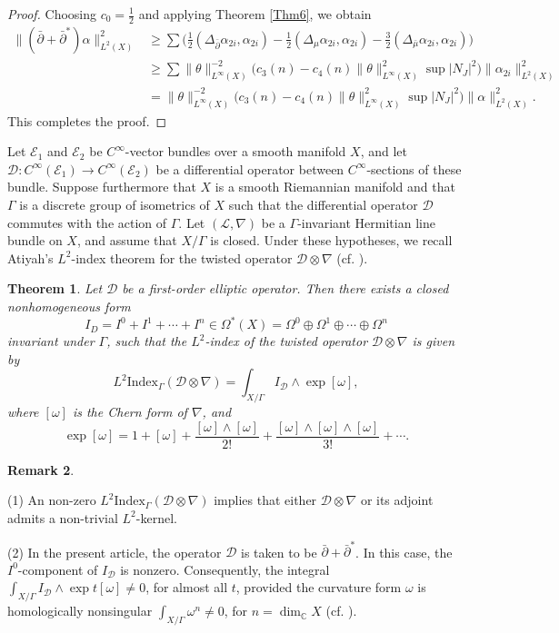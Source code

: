 \documentclass[12pt, twoside]{article}
\newtheorem{theorem}{Theorem}[section]
\theoremstyle{definition}
\newtheorem{remark}[theorem]{Remark}
\numberwithin{equation}{section}
\def \C {\mathbb{C}}
\def \a {\alpha }
\def \De {\Delta}
\def\w {\omega}
\def\Om{\Omega}
\def\pa{\partial}
\def\na {\nabla}
\def\Ga{\Gamma}
\begin{document}
\begin{proof}
	Choosing $c_{0} = \frac{1}{2}$ and applying Theorem \ref{Thm6}, we obtain
	\begin{equation*}
	\begin{split}
	\|({\bar{\partial}+\bar{\partial}^{\ast}})\a\|_{L^{2}(X)}^{2}
	&\geq\sum\Big(\frac{1}{2}(\De_{\bar{\pa}}\a_{2i},\a_{2i})-\frac{1}{2}(\De_{\mu}\a_{2i},\a_{2i})-\frac{3}{2}(\De_{\bar{\mu}}\a_{2i},\a_{2i})\Big)\\
	&\geq \sum \|\theta\|^{-2}_{L^{\infty}(X)}\Big(c_{3}(n)-c_{4}(n)\|\theta\|^{2}_{L^{\infty}(X)}\sup|N_J|^{2}\Big)\|\a_{2i}\|^{2}_{L^{2}(X)}\\
	&= \|\theta\|^{-2}_{L^{\infty}(X)}\Big(c_{3}(n)-c_{4}(n)\|\theta\|^{2}_{L^{\infty}(X)}\sup|N_J|^{2}\Big)\|\a\|_{L^{2}(X)}^{2}.
	\end{split}
	\end{equation*}
	This completes the proof.
\end{proof}

Let $\mathcal{E}_{1}$ and $\mathcal{E}_{2}$ be $C^{\infty}$-vector bundles over a smooth manifold $X$, 
and let $\mathcal{D}:C^{\infty}(\mathcal{E}_{1})\rightarrow C^{\infty}(\mathcal{E}_{2})$ be a differential operator between $C^{\infty}$-sections of these bundle. 
Suppose furthermore that $X$ is a smooth Riemannian manifold and that $\Ga$ is a discrete group of isometrics of $X$ such that 
the differential operator $\mathcal{D}$ commutes with the action of $\Ga$. Let $(\mathcal{L},\na)$ be a $\Ga$-invariant Hermitian line bundle on $X$, 
and assume that $X/\Ga$ is closed. Under these hypotheses, we recall Atiyah's $L^{2}$-index theorem for the twisted operator $\mathcal{D}\otimes\na$ (cf. \cite{Gro}).

\begin{theorem}\cite[Theorem 2.3.A]{Gro}\label{Thm5}
	Let $\mathcal{D}$ be a first-order elliptic operator. Then there exists a closed nonhomogeneous form
	\[I_{D}=I^{0}+I^{1}+\cdots+I^{n}\in\Om^{\ast}(X)=\Om^{0}\oplus\Om^{1}\oplus\cdots\oplus\Om^{n} \]
	invariant under $\Ga$, such that the $L^{2}$-index of the twisted operator $\mathcal{D}\otimes\na$ is given by
	\[L^{2}\mathrm{Index}_{\Ga}(\mathcal{D}\otimes\na)=\int_{X/\Ga}I_{\mathcal{D}}\wedge\exp{[\w]}, \]
	where $[\w]$ is the Chern form of $\na$, and
	\[\exp{[\w]}=1+[\w]+\frac{[\w]\wedge[\w]}{2!}+\frac{[\w]\wedge[\w]\wedge[\w]}{3!}+\cdots. \]
\end{theorem}

\begin{remark}\label{Rem}
	
	(1)	An non-zero $L^{2}\mathrm{Index}_{\Ga}(\mathcal{D}\otimes\na)$ implies that 
	either $\mathcal{D}\otimes\na$ or its adjoint admits a non-trivial $L^{2}$-kernel.
	
	(2) In the present article, the operator $\mathcal{D}$ is taken to be $\bar{\pa}+\bar{\pa}^{\ast}$. 
	In this case, the $I^{0}$-component of $I_{\mathcal{D}}$ is nonzero. 
	Consequently, the integral $\int_{X/\Ga}I_{\mathcal{D}}\wedge\exp{t[\w]}\neq 0$, for almost all $t$, 
	provided the curvature form $\w$ is homologically nonsingular $\int_{X/\Ga}\w^{n}\neq 0$, for $n=\dim_{\C}X$ (cf. \cite[2.3.$\mathrm{A}'$. Remarks]{Gro}).
\end{remark}
\end{document}
